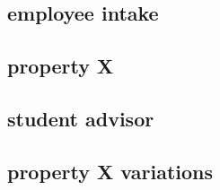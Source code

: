 \documentclass[10pt,a4paper]{article}
\begin{document}


\subsection{employee intake}


\subsection{property X}


\subsection{student advisor}


\subsection{property X variations}

\end{document}
